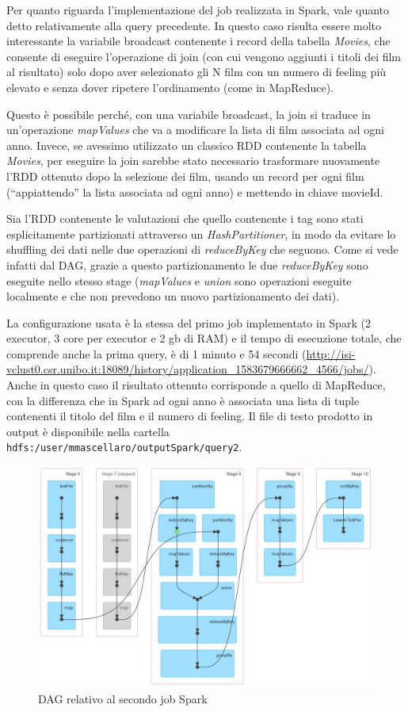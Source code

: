 \documentclass[10pt]{article}
\begin{document}
Per quanto riguarda l'implementazione del job realizzata in Spark, vale quanto detto relativamente alla query precedente. In questo caso risulta essere molto interessante la variabile broadcast contenente i record della tabella \textit{Movies}, che consente di eseguire l'operazione di join (con cui vengono aggiunti i titoli dei film al risultato) solo dopo aver selezionato gli N film con un numero di feeling più elevato e senza dover ripetere l'ordinamento (come in MapReduce).

Questo è possibile perché, con una variabile broadcast, la join si traduce in un'operazione \textit{mapValues} che va a modificare la lista di film associata ad ogni anno. Invece, se avessimo utilizzato un classico RDD contenente la tabella \textit{Movies}, per eseguire la join sarebbe stato necessario trasformare nuovamente l'RDD ottenuto dopo la selezione dei film, usando un record per ogni film (``appiattendo'' la lista associata ad ogni anno) e mettendo in chiave movieId.

Sia l'RDD contenente le valutazioni che quello contenente i tag sono stati esplicitamente partizionati attraverso un \textit{HashPartitioner}, in modo da evitare lo shuffling dei dati nelle due operazioni di \textit{reduceByKey} che seguono. Come si vede infatti dal DAG, grazie a questo partizionamento le due \textit{reduceByKey} sono eseguite nello stesso stage (\textit{mapValues} e \textit{union} sono operazioni eseguite localmente e che non prevedono un nuovo partizionamento dei dati).
 
La configurazione usata è la stessa del primo job implementato in Spark (2 executor, 3 core per executor e 2 gb di RAM) e il tempo di esecuzione totale, che comprende anche la prima query, è di 1 minuto e 54 secondi (\url{http://isi-vclust0.csr.unibo.it:18089/history/application_1583679666662_4566/jobs/}). Anche in questo caso il risultato ottenuto corrisponde a quello di MapReduce, con la differenza che in Spark ad ogni anno è associata una lista di tuple contenenti il titolo del film e il numero di feeling. Il file di testo prodotto in output è disponibile nella cartella \texttt{hdfs:/user/mmascellaro/outputSpark/query2}.

\begin{figure}[th]
	\centering
	\includegraphics[scale=0.55]{images/DagSpark2.jpg}
	\caption{DAG relativo al secondo job Spark}
\end{figure}
\end{document}
